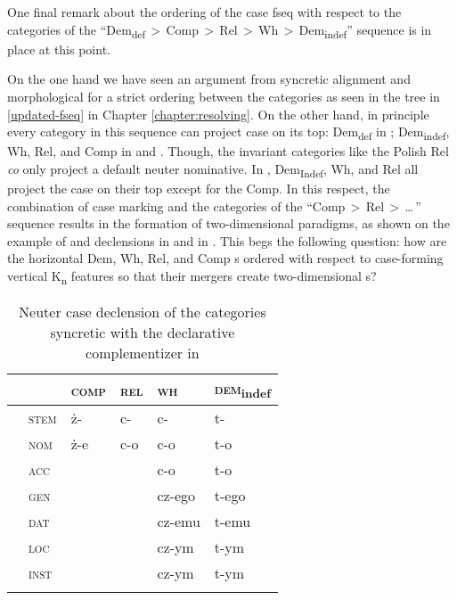 One final remark about the ordering of the case fseq with respect to the categories of the ``Dem\textsubscript{def}\,$>$\,Comp\,$>$\,Rel\,$>$\,Wh\,$>$\,Dem\textsubscript{indef}'' sequence is in place at this point.
\par
On the one hand we have seen an argument from syncretic alignment and morphological  for a strict ordering between the categories as seen in the tree in \ref{updated-fseq} in Chapter \ref{chapter:resolving}. On the other hand, in principle every category in this sequence can project case on its top: Dem\textsubscript{def} in ; Dem\textsubscript{indef}, Wh, Rel, and Comp in  and . Though, the invariant categories like the Polish Rel \textit{co} only project a default neuter nominative. In , Dem\textsubscript{Indef}, Wh, and Rel all project the case  on their top except for the Comp. In this respect, the combination of case marking and the categories of the \mbox{``Comp\,$>$\,Rel\,$>$\,\ldots \,''} sequence results in the formation of two-dimensional paradigms, as shown on the example of  and  declensions in  and in . This begs the following question: how are the horizontal Dem, Wh, Rel, and Comp s ordered with respect to case-forming vertical K\textsubscript{n}  features so that their mergers create two-dimensional s? 

\begin{table}
\caption{Neuter case declension of the categories syncretic with the declarative complementizer in }
\label{2D:Pol}
\begin{tabular}[h]{ l l l l l l }
 \lsptoprule
		& 			& \textsc{comp} & \textsc{rel} 	& \textsc{wh}  	& \textsc{dem}\textsubscript{indef}\\
\midrule	
 	& \textsc{stem}	& \.z-		 & c-\cellcolor[gray]{0.95}		& c-\cellcolor[gray]{0.95}	& t-\\
		& \textsc{nom}	&  \.z-e		 & c-o\cellcolor[gray]{0.85}	& c-o\cellcolor[gray]{0.85}	& t-o\\
 		& \textsc{acc}	&			 & 			& c-o\cellcolor[gray]{0.85}		& t-o\\
		& \textsc{gen}	&			 & 			& cz-ego		& t-ego\\	
		& \textsc{dat}	&			 & 			& cz-emu		& t-emu\\
		& \textsc{loc}	&			 & 			& cz-ym\cellcolor[gray]{0.75}	& t-ym\\
		& \textsc{inst}	&			 &			& cz-ym\cellcolor[gray]{0.75}	& t-ym\\
\lspbottomrule
\end{tabular}
\end{table}


